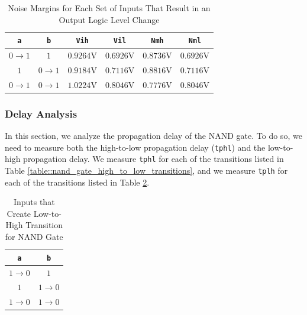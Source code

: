 \documentclass[fleqn]{article}
\begin{document}
	\begin{table}[H]
	\begin{center}
	\caption{Noise Margins for Each Set of Inputs That Result in an Output Logic Level Change}
	\label{table::nand_gate_noise_analysis}
	\begin{tabular}{| c | c | c | c | c | c |}
		\hline
		\texttt{a} & \texttt{b} & \texttt{Vih} & \texttt{Vil} & \texttt{Nmh} & \texttt{Nml} \\
		\hline	
		$0 \rightarrow 1$ & $1$ & $0.9264 \text{V}$ & $0.6926 \text{V}$ & $0.8736 \text{V}$ & $0.6926 \text{V}$\\
		\hline	
		$1$ & $0 \rightarrow 1$ & $0.9184 \text{V}$ & $0.7116 \text{V}$ & $0.8816 \text{V}$ & $0.7116 \text{V}$\\
		\hline	
		$0 \rightarrow 1$ & $0 \rightarrow 1$ & $1.0224 \text{V}$ & $0.8046 \text{V}$ & $0.7776 \text{V}$ & $0.8046 \text{V}$\\
		\hline
	\end{tabular}
	\end{center}
	\end{table}
	
	\subsubsection{Delay Analysis}
	
	In this section, we analyze the propagation delay of the NAND gate. To do so, we need to measure both the high-to-low propagation delay (\texttt{tphl}) and the low-to-high propagation delay. We measure \texttt{tphl} for each of the transitions listed in Table \ref{table::nand_gate_high_to_low_transitions}, and we measure \texttt{tplh} for each of the transitions listed in Table \ref{table::nand_gate_low_to_high_transitions}.
	
	\begin{table}[H]
	\begin{center}
	\caption{Inputs that Create Low-to-High Transition for NAND Gate}
	\label{table::nand_gate_low_to_high_transitions}
	\begin{tabular}{| c | c |}
		\hline
		\texttt{a} & \texttt{b} \\
		\hline	
		$1 \rightarrow 0$ & $1$\\
		\hline	
		$1$ & $1 \rightarrow 0$\\
		\hline	
		$1 \rightarrow 0$ & $1 \rightarrow 0$\\
		\hline
	\end{tabular}
	\end{center}
	\end{table}
	
\end{document}
